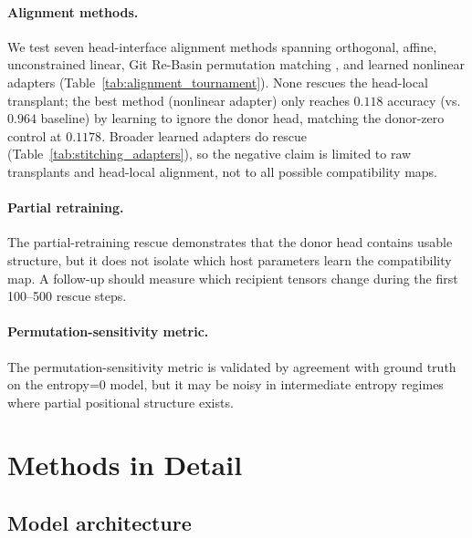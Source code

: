 \documentclass[final]{article}
\begin{document}
\paragraph{Alignment methods.} We test seven head-interface alignment methods spanning
orthogonal, affine, unconstrained linear, Git Re-Basin permutation matching
\citep{ainsworth2022git}, and learned nonlinear adapters
(Table~\ref{tab:alignment_tournament}). None rescues the head-local transplant;
the best method (nonlinear adapter) only reaches $0.118$ accuracy
(vs.\ $0.964$ baseline) by learning to ignore the donor head, matching
the donor-zero control at $0.1178$. Broader learned adapters do rescue
(Table~\ref{tab:stitching_adapters}), so the negative claim is limited to
raw transplants and head-local alignment, not to all possible compatibility
maps.

\paragraph{Partial retraining.} The partial-retraining rescue demonstrates that
the donor head contains usable structure, but it does not isolate which host
parameters learn the compatibility map. A follow-up should measure which
recipient tensors change during the first 100--500 rescue steps.

\paragraph{Permutation-sensitivity metric.} The permutation-sensitivity metric
is validated by agreement with ground truth on the entropy=0 model, but it may
be noisy in intermediate entropy regimes where partial positional structure
exists.




\appendix

\section{Methods in Detail}
\label{app:methods}

\subsection{Model architecture}
\end{document}
